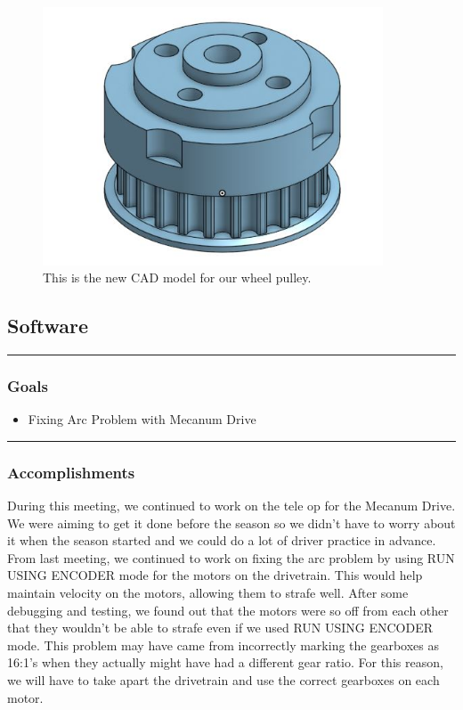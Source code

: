 \begin{figure}[htp]
\centering
\includegraphics[width=0.9\textwidth, angle=0]{Meetings/September/09-16-21/9-16-21_Hardware_Image3 - Nathan Forrer.JPG}
\caption{This is the new CAD model for our wheel pulley.}
\label{fig:pic3}
\end{figure}

\subsection*{Software}
\noindent\hfil\rule{\textwidth}{.4pt}\hfil
\subsubsection*{Goals}
\begin{itemize}
    \item Fixing Arc Problem with Mecanum Drive

\end{itemize} 

\noindent\hfil\rule{\textwidth}{.4pt}\hfil

\subsubsection*{Accomplishments}
During this meeting, we continued to work on the tele op for the Mecanum Drive. We were aiming to get it done before the season so we didn't have to worry about it when the season started and we could do a lot of driver practice in advance. From last meeting, we continued to work on fixing the arc problem by using RUN USING ENCODER mode for the motors on the drivetrain. This would help maintain velocity on the motors, allowing them to strafe well. After some debugging and testing, we found out that the motors were so off from each other that they wouldn't be able to strafe even if we used RUN USING ENCODER mode. This problem may have came from incorrectly marking the gearboxes as 16:1's when they actually might have had a different gear ratio. For this reason, we will have to take apart the drivetrain and use the correct gearboxes on each motor.